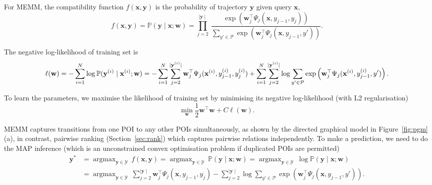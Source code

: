 \documentclass[9pt]{extarticle}
\DeclareMathOperator*{\argmax}{argmax}
\begin{document}
For MEMM, the compatibility function $f(\mathbf{x}, \mathbf{y})$ is the probability of trajectory $\mathbf{y}$ given query $\mathbf{x}$,
\begin{equation*}
f(\mathbf{x}, \mathbf{y}) 
= \mathbb{P}(\mathbf{y} \mid \mathbf{x}; \mathbf{w}) 
= \prod_{j=2}^{\mid \mathbf{y} \mid}~
  \frac{\exp \left(\mathbf{w}_j^\top \Psi_j(\mathbf{x}, y_{j-1}, y_j) \right)}
       {\sum_{y' \in \mathcal{P}} \exp \left(\mathbf{w}_j^\top \Psi_j(\mathbf{x}, y_{j-1}, y') \right)}.
\end{equation*}

The negative log-likelihood of training set is
\begin{equation*}
\ell(\mathbf{w}) 
= -\sum_{i=1}^N \log \mathbb{P}(\mathbf{y}^{(i)} \mid \mathbf{x}^{(i)}; \mathbf{w}) \\
= -\sum_{i=1}^N \sum_{j=2}^{\mid \mathbf{y}^{(i)} \mid} 
                \mathbf{w}_j^\top \Psi_j(\mathbf{x}^{(i)}, y_{j-1}^{(i)}, y_j^{(i)}) +
   \sum_{i=1}^N \sum_{j=2}^{\mid \mathbf{y}^{(i)} \mid} 
                \log \sum_{y' \in \mathcal{P}} \exp \left(\mathbf{w}_j^\top \Psi_j(\mathbf{x}^{(i)}, y_{j-1}^{(i)}, y') \right).
\end{equation*}

To learn the parameters, we maximise the likelihood of training set by minimising its negative log-likelihood (with L2 regularisation)
\begin{equation}
\label{eq:trainmemm}
\min_{\mathbf{w}} \frac{1}{2} \mathbf{w}^\top \mathbf{w} + C \ell(\mathbf{w}).
\end{equation}

MEMM captures transitions from one POI to any other POIs simultaneously, as shown by the directed graphical model in Figure~\ref{fig:pgm}(a),
in contrast, pairwise ranking (Section~\ref{sec:rank}) which captures pairwise relations independently.
To make a prediction, we need to do the MAP inference (which is an unconstrained convex optimisation problem if duplicated POIs are permitted)
\begin{equation}
\label{eq:testmemm}
\begin{aligned}
\mathbf{y}^* 
&= \argmax_{\mathbf{y} \in \mathcal{Y}}~f(\mathbf{x}, \mathbf{y})
 = \argmax_{\mathbf{y} \in \mathcal{Y}}~\mathbb{P}(\mathbf{y} \mid \mathbf{x}; \mathbf{w})
 = \argmax_{\mathbf{y} \in \mathcal{Y}}~\log \mathbb{P}(\mathbf{y} \mid \mathbf{x}; \mathbf{w}) \\
&= \argmax_{\mathbf{y} \in \mathcal{Y}}~\sum_{j=2}^{\mid \mathbf{y} \mid} \mathbf{w}_j^\top \Psi_j(\mathbf{x}, y_{j-1}, y_j) - 
   \sum_{j=2}^{\mid \mathbf{y} \mid} \log \sum_{y' \in \mathcal{P}} \exp \left(\mathbf{w}_j^\top \Psi_j(\mathbf{x}, y_{j-1}, y') \right).
\end{aligned}
\end{equation}
\end{document}
